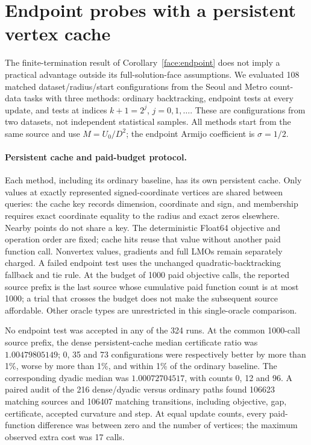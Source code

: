 \section{Endpoint probes with a persistent vertex cache}
\label{app:endpoint}
The finite-termination result of Corollary~\ref{face:endpoint} does not
imply a practical advantage outside its full-solution-face assumptions.
We evaluated 108 matched dataset/radius/start configurations from the
Seoul and Metro count-data tasks with three methods: ordinary
backtracking, endpoint tests at every update, and tests at indices
$k+1=2^j$, $j=0,1,\ldots$. These are configurations from two datasets,
not independent statistical samples. All methods start from the same
source and use $M=U_0/D^2$; the endpoint Armijo coefficient is
$\sigma=1/2$.

\paragraph{Persistent cache and paid-budget protocol.}
Each method, including its ordinary baseline, has its own persistent
cache. Only values at exactly represented signed-coordinate vertices
are shared between queries: the cache key records dimension, coordinate
and sign, and membership requires exact coordinate equality to the
radius and exact zeros elsewhere. Nearby points do not share a key.
The deterministic Float64 objective and operation order are fixed;
cache hits reuse that value without another paid function call.
Nonvertex values, gradients and full LMOs remain separately charged.
A failed endpoint test uses the unchanged quadratic-backtracking
fallback and tie rule. At the budget of 1000 paid objective calls, the
reported source prefix is the last source whose cumulative paid
function count is at most 1000; a trial that crosses the budget does
not make the subsequent source affordable. Other oracle types are
unrestricted in this single-oracle comparison.



No endpoint test was accepted in any of the 324 runs. At the common
1000-call source prefix, the dense persistent-cache median certificate
ratio was $1.00479805149$; 0, 35 and 73 configurations were respectively
better by more than 1\%, worse by more than 1\%, and within 1\% of the
ordinary baseline. The corresponding dyadic median was $1.00072704517$,
with counts 0, 12 and 96. A paired audit of the 216 dense/dyadic versus
ordinary paths found 106623 matching sources and 106407 matching
transitions, including objective, gap, certificate, accepted curvature
and step. At equal update counts, every paid-function difference was
between zero and the number of vertices; the maximum observed extra
cost was 17 calls.

